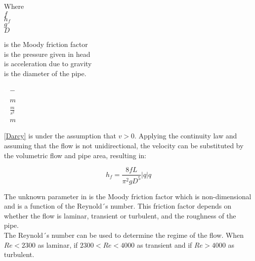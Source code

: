  \begin{minipage}[t]{0.20\textwidth}
Where\\
\hspace*{8mm} $f$ \\
\hspace*{8mm} $h_f$ \\
\hspace*{8mm} $g$ \\
\hspace*{8mm} $D$ 
\end{minipage}
\begin{minipage}[t]{0.68\textwidth}
\vspace*{2mm}
is the Moody friction factor\\ 
is the pressure given in head\\ 
is acceleration due to gravity\\
is the diameter of the pipe.
\end{minipage}
\begin{minipage}[t]{0.10\textwidth}
\vspace*{2mm}
\textcolor{White}{te}$\unit{-}$\\
\textcolor{White}{te}$\unit{m}$\\
\textcolor{White}{te}$\unit{\frac{m}{s^2}}$\\
\textcolor{White}{te}$\unit{m}$
\end{minipage}

\eqref{Darcy} is under the assumption that $v>0$.%
Applying the continuity law and assuming that the flow is not unidirectional, the velocity can be substituted by the volumetric flow and pipe area, resulting in:

\begin{equation}
  h_f = \frac{8fL}{\pi^{2}gD^5} |q| q
  \label{DarcyWeisbach}
\end{equation} 
 
 The unknown parameter in  is the Moody friction factor 
 which is non-dimensional and is a function of the Reynold´s number. This friction factor depends on whether the flow is laminar, transient or turbulent, and the roughness of the pipe\cite{Intro_Fluid}. \\
 
 
The Reynold´s number can be used to determine the regime of the flow\cite{Intro_Fluid}. When $Re<2300$ as laminar, if $2300<Re<4000$ as transient and if
$Re>4000$ as turbulent. 

